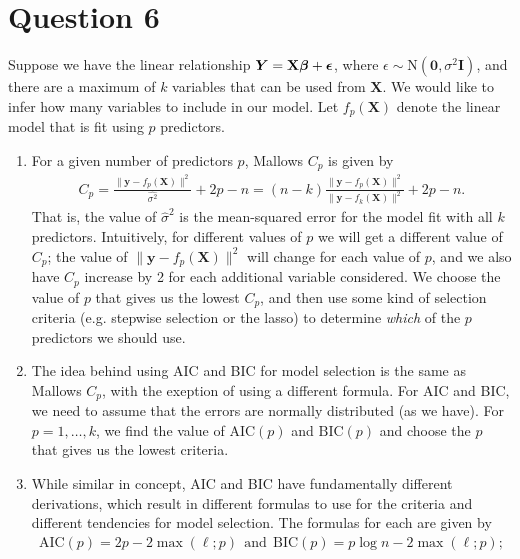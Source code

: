 \documentclass[10pt]{article}
\begin{document}
\section{Question 6} \noindent
Suppose we have the linear relationship \(\bm{Y} = \mathbf{X}\bm{\beta} + \bm{\epsilon}\), where \(\epsilon \sim \mathrm{N}(\mathbf{0}, \sigma^2 \mathbf{I})\), 
and there are a maximum of \(k\) variables that can be used from \(\mathbf{X}\). We would like to infer how many variables to include in our model. 
Let \(f_p(\mathbf{X})\) denote the linear model that is fit using \(p\) predictors. 
\begin{enumerate}
    \item For a given number of predictors \(p\), Mallows \(C_p\) is given by 
    \begin{align*}
        C_p
        = \frac{\| \mathbf{y} - f_p(\mathbf{X}) \|^2}{\hat{\sigma^2}} + 2p - n
        = (n - k)\frac{\| \mathbf{y} - f_p(\mathbf{X}) \|^2}{\| \mathbf{y} - f_k(\mathbf{X}) \|^2} + 2p - n.
    \end{align*}
    That is, the value of \(\hat{\sigma}^2\) is the mean-squared error for the model fit with all \(k\) predictors. 
    Intuitively, for different values of \(p\) we will get a different value of \(C_p\); the value of \(\| \mathbf{y} - f_p(\mathbf{X}) \|^2\) will change 
    for each value of \(p\), and we also have \(C_p\) increase by 2 for each additional variable considered. 
    We choose the value of \(p\) that gives us the lowest \(C_p\), and then use some kind of selection criteria (e.g. stepwise selection or the lasso) 
    to determine \textsl{which} of the \(p\) predictors we should use. 
    \item The idea behind using AIC and BIC for model selection is the same as Mallows \(C_p\), with the exeption of using a different formula. For AIC and BIC,
    we need to assume that the errors are normally distributed (as we have). For \(p = 1, \ldots, k\), we find the value of \(\mathrm{AIC}(p)\) and \(\mathrm{BIC}(p)\)
    and choose the \(p\) that gives us the lowest criteria. 
    \item While similar in concept, AIC and BIC have fundamentally different derivations, which result in different formulas to use for the criteria 
    and different tendencies for model selection. The formulas for each are given by 
    \begin{align*}
        \mathrm{AIC}(p)
        = 2p - 2 \max(\ell;p)
        ~~\text{and}~~
        \mathrm{BIC}(p)
        = p \log n - 2 \max(\ell;p);
    \end{align*}

\end{enumerate}
\end{document}
